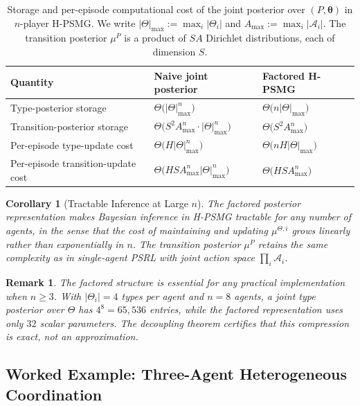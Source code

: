 \documentclass{article}
\newtheorem{corollary}[theorem]{Corollary}
\newtheorem{remark}[theorem]{Remark}
\begin{document}
\begin{table}[h]
\caption{Storage and per-episode computational cost of the joint posterior over $(P, \boldsymbol{\theta})$ in $n$-player H-PSMG. We write $|\Theta|_{\max} := \max_i |\Theta_i|$ and $A_{\max} := \max_i |\mathcal{A}_i|$. The transition posterior $\mu^P$ is a product of $SA$ Dirichlet distributions, each of dimension $S$.}
\label{tab:complexity}
\begin{center}
\begin{tabular}{lll}
\toprule
Quantity & Naive joint posterior & Factored H-PSMG \\
\midrule
Type-posterior storage & $\Theta\big(|\Theta|_{\max}^n\big)$ & $\Theta\big(n |\Theta|_{\max}\big)$ \\
Transition-posterior storage & $\Theta\big(S^2 A_{\max}^n \cdot |\Theta|_{\max}^n\big)$ & $\Theta\big(S^2 A_{\max}^n\big)$ \\
Per-episode type-update cost & $\Theta\big(H |\Theta|_{\max}^n\big)$ & $\Theta\big(n H |\Theta|_{\max}\big)$ \\
Per-episode transition-update cost & $\Theta\big(H S A_{\max}^n |\Theta|_{\max}^n\big)$ & $\Theta\big(H S A_{\max}^n\big)$ \\
\bottomrule
\end{tabular}
\end{center}
\end{table}

\begin{corollary}[Tractable Inference at Large \texorpdfstring{$n$}{n}]
\label{cor:scale}
The factored posterior representation makes Bayesian inference in H-PSMG tractable for any number of agents, in the sense that the cost of maintaining and updating $\mu^{\Theta,i}$ grows linearly rather than exponentially in $n$. The transition posterior $\mu^P$ retains the same complexity as in single-agent PSRL with joint action space $\prod_i \mathcal{A}_i$.
\end{corollary}

\begin{remark}
The factored structure is essential for any practical implementation when $n \geq 3$. With $|\Theta_i| = 4$ types per agent and $n = 8$ agents, a joint type posterior over $\Theta$ has $4^8 = 65{,}536$ entries, while the factored representation uses only $32$ scalar parameters. The decoupling theorem certifies that this compression is exact, not an approximation.
\end{remark}

\subsection{Worked Example: Three-Agent Heterogeneous Coordination}
\end{document}
